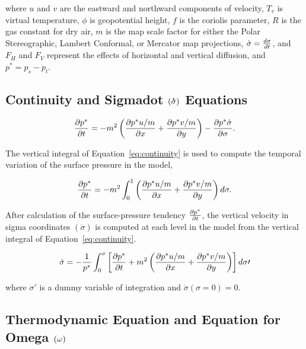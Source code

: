 where $u$ and $v$ are the eastward and northward components of
velocity, $T_v$ is virtual temperature, $\phi$ is geopotential height, $f$ is
the coriolis parameter, $R$ is the gas constant for dry air, $m$ is the map
scale factor for either the Polar Stereographic, Lambert Conformal, or Mercator
map projections, $\dot{\sigma} = {d\sigma \over dt}$, and $F_H$ and $F_V$
represent the effects of horizontal and vertical diffusion, and
$p^{\ast}=p_s-p_t$.  \\

\subsection{Continuity and Sigmadot $({\bf \dot{\sigma}})$ Equations}

\begin{eqnarray} \label{eq:continuity}
{{\partial{p^{\ast}} \over \partial{t}}}
= -m^2 \left( {\partial{p^{\ast}u/m} \over \partial{x}} + {\partial{p^{\ast}v/m}
\over \partial{y}} \right) - {\partial{p^{\ast}\dot{\sigma}} \over
\partial{\sigma}}.
\end{eqnarray}

The vertical integral of Equation~\ref{eq:continuity} is used to
compute the temporal variation of the surface pressure in the model,

\begin{eqnarray}
{{\partial{p^{\ast}} \over \partial{t}}} = -m^2 \int_{0}^{1}
\left( {\partial{p^{\ast}u/m} \over \partial{x}} + {\partial{p^{\ast}v/m} \over
\partial{y}} \right) d\sigma.
\end{eqnarray}

After calculation of the surface-pressure tendency
${\partial{p^{\ast}} \over \partial{t}}$, the
vertical velocity in sigma coordinates $(\dot{\sigma})$ is computed at each
level in the model from the vertical integral of Equation~\ref{eq:continuity}.

\begin{eqnarray}
\dot{\sigma} = - {1 \over p^{\ast}} \int_{0}^{\sigma} \left[
{\partial{p^{\ast}} \over \partial{t}} + m^2 \left( {\partial{p^{\ast}u/m} \over
\partial{x}} + {\partial{p^{\ast}v/m} \over \partial{y}} \right) \right]
d\sigma\prime
\end{eqnarray}

where $\sigma\prime$ is a dummy
variable of integration and $\dot{\sigma}(\sigma=0)=0$.

\subsection{Thermodynamic Equation and Equation for Omega ${\bf (\omega)}$}

